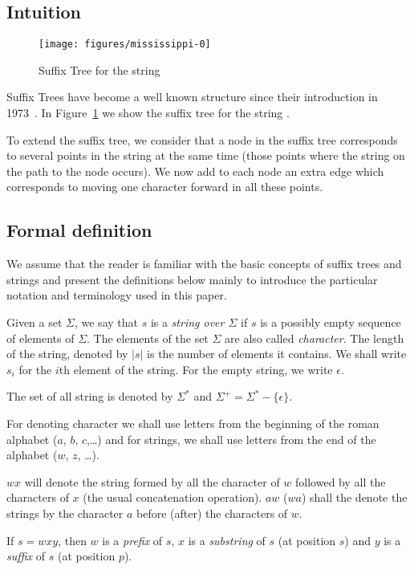 \subsection{Intuition}

\begin{figure}
\texttt{[image: figures/mississippi-0]}
\caption{Suffix Tree for the string }%
\label{fig:mississippi-0}
\end{figure}

Suffix Trees have become a well known structure since their introduction in 1973~\cite{DBLP:conf/focs/Weiner73}. In Figure~\ref{fig:mississippi-0} we show the suffix tree for the string .

To extend the suffix tree, we consider that a node in the suffix tree corresponds to several points in the string at the same time (those points where the string on the path to the node occurs). We now add to each node an extra edge which corresponds to moving one character forward in all these points.

\subsection{Formal definition}

We assume that the reader is familiar with the basic concepts of suffix trees and strings and present the definitions below mainly to introduce the particular notation and terminology used in this paper.

\begin{definition}
Given a set $\Sigma$, we say that $s$ is a \emph{string over $\Sigma$} if $s$ is a possibly empty sequence of elements of $\Sigma$. The elements of the set $\Sigma$ are also called \emph{character}. The length of the string, denoted by $|s|$ is the number of elements it contains. We shall write $s_i$ for the $i$th element of the string. For the empty string, we write $\epsilon$.

The set of all string is denoted by $\Sigma^*$ and $\Sigma^+=\Sigma^*-\{\epsilon\}$.
\end{definition}

For denoting character we shall use letters from the beginning of the roman alphabet ($a$, $b$, $c$,\ldots) and for strings, we shall use letters from the end of the alphabet ($w$, $z$, \ldots).

\begin{definition}
$wx$ will denote the string formed by all the character of $w$ followed by all the characters of $x$ (the usual concatenation operation). $aw$ ($wa$) shall the denote the strings by the character $a$ before (after) the characters of $w$.

If $s = wxy$, then $w$ is a \emph{prefix} of $s$, $x$ is a \emph{substring} of $s$ (at position $s$) and $y$ is a \emph{suffix} of $s$ (at position $p$).
\end{definition}

